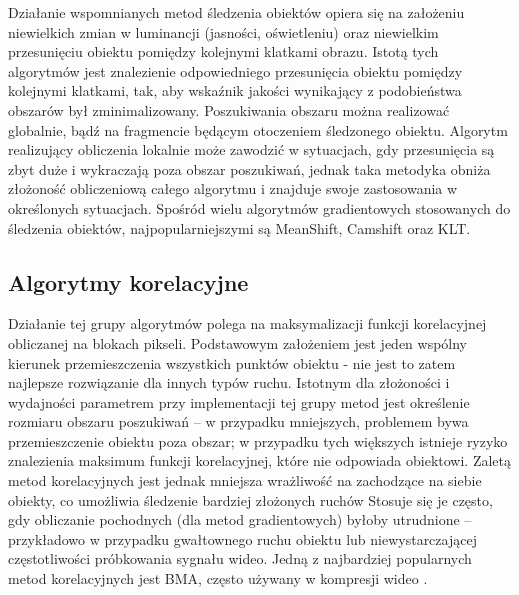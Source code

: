 Działanie wspomnianych metod śledzenia obiektów opiera się na założeniu niewielkich zmian w luminancji (jasności, oświetleniu) oraz niewielkim przesunięciu obiektu pomiędzy kolejnymi klatkami obrazu. %
Istotą tych algorytmów jest znalezienie odpowiedniego przesunięcia obiektu pomiędzy kolejnymi klatkami, tak, aby wskaźnik jakości wynikający z podobieństwa obszarów był zminimalizowany. 
Poszukiwania obszaru można realizować globalnie, bądź na fragmencie będącym otoczeniem śledzonego obiektu. 
Algorytm realizujący obliczenia lokalnie może zawodzić w sytuacjach, gdy przesunięcia są zbyt duże i wykraczają poza obszar poszukiwań, jednak taka metodyka obniża złożoność obliczeniową całego algorytmu i znajduje swoje zastosowania w określonych sytuacjach. %
Spośród wielu algorytmów gradientowych stosowanych do śledzenia obiektów, najpopularniejszymi są MeanShift, Camshift oraz KLT. %

\subsection{Algorytmy korelacyjne}

Działanie tej grupy algorytmów polega na maksymalizacji funkcji korelacyjnej obliczanej na blokach pikseli. %
Podstawowym założeniem jest jeden wspólny kierunek przemieszczenia wszystkich punktów obiektu - nie jest to zatem najlepsze rozwiązanie dla innych typów ruchu. %
Istotnym dla złożoności i wydajności parametrem przy implementacji tej grupy metod jest określenie rozmiaru obszaru poszukiwań -- w przypadku mniejszych, problemem bywa przemieszczenie obiektu poza obszar; w przypadku tych większych istnieje ryzyko znalezienia maksimum funkcji korelacyjnej, które nie odpowiada obiektowi. %
Zaletą metod korelacyjnych jest jednak mniejsza wrażliwość na zachodzące na siebie obiekty, co umożliwia śledzenie bardziej złożonych ruchów %
Stosuje się je często, gdy obliczanie pochodnych (dla metod gradientowych) byłoby utrudnione -- przykładowo w przypadku gwałtownego ruchu obiektu lub niewystarczającej częstotliwości próbkowania sygnału wideo. %
Jedną z najbardziej popularnych metod korelacyjnych jest BMA, często używany w kompresji wideo \cite{Aroh}.

